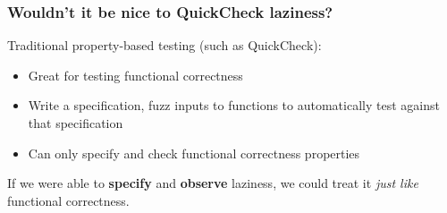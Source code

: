 \documentclass{beamer}
\newcommand{\greentick}[0]{\color{forestgreen}\ding{51}}
\newcommand{\redcross}[0]{\color{red}\ding{55}}
\begin{document}

\begin{frame}
\frametitle{Wouldn't it be nice to QuickCheck laziness?}
Traditional property-based testing (such as QuickCheck):
\begin{itemize}
\item[\greentick] Great for testing functional correctness
\item[\greentick] Write a specification, fuzz inputs to functions to automatically test against that specification
\item[\redcross] Can only specify and check functional correctness properties
\end{itemize}
If we were able to \textbf{specify} and \textbf{observe} laziness, we could
treat it \emph{just like} functional correctness.
\end{frame}

\end{document}
